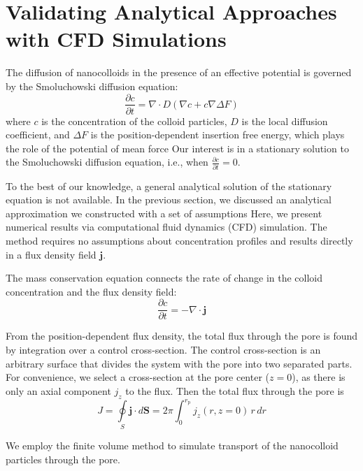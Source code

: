 \documentclass[10pt, a4paper]{article}
\begin{document}
\section{Validating Analytical Approaches with CFD Simulations}

\begin{multicols}{2}
The diffusion of nanocolloids in the presence of an effective potential is governed by the Smoluchowski diffusion equation:
\begin{equation}
    \label{eq:Smoluchowski}
    \frac{\partial c}{\partial t} = \nabla \cdot D(\nabla c + c \nabla \Delta F)
\end{equation}
where $c$ is the concentration of the colloid particles, $D$ is the local diffusion coefficient, and $\Delta F$ is the position-dependent insertion free energy, which plays the role of the potential of mean force
Our interest is in a stationary solution to the Smoluchowski diffusion equation, i.e., when $\frac{\partial c}{\partial t} = 0$.

To the best of our knowledge, a general analytical solution of the stationary equation is not available.
In the previous section, we discussed an analytical approximation we constructed with a set of assumptions
Here, we present numerical results via computational fluid dynamics (CFD) simulation.
The method requires no assumptions about concentration profiles and results directly in a flux density field $\mathbf{j}$.

The mass conservation equation connects the rate of change in the colloid concentration and the flux density field:
\begin{equation}
    \frac{\partial c}{\partial t} = -\nabla \cdot \mathbf{j}
\end{equation}

From the position-dependent flux density, the total flux through the pore is found by integration over a control cross-section.
The control cross-section is an arbitrary surface that divides the system with the pore into two separated parts.
For convenience, we select a cross-section at the pore center ($z = 0$), as there is only an axial component $j_z$ to the flux.
Then the total flux through the pore is
\begin{equation}
    \label{eq:total_flux_1}
    J = \oint\limits_{S} \mathbf{j} \cdot d\mathbf{S} = 2 \pi \int_0^{r_{\text{p}}} j_z(r, z = 0) \, r \, dr
\end{equation}

We employ the finite volume method to simulate transport of the nanocolloid particles through the pore.


\end{multicols}
\end{document}
